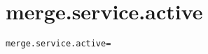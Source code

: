 \section{merge.service.active}
\label{configuration:MergeServiceActive}
\ClearAPI
\TODO
\begin{lstlisting}[style=Props,caption={Usage example for \textit{merge.service.active}}]
merge.service.active=
\end{lstlisting}